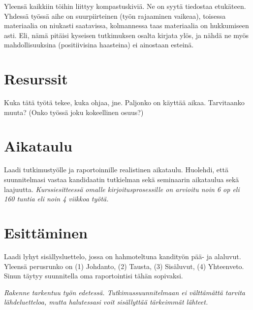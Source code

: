 \documentclass[12pt,a4paper,finnish,oneside]{article}
\begin{document}
Yleensä kaikkiin töihin liittyy kompastuskiviä. Ne on syytä tiedostaa
etukäteen. Yhdessä työssä aihe on suurpiirteinen (työn rajaaminen
vaikeaa), toisessa materiaalia on niukasti saatavissa, kolmannessa
taas materiaalia on hukkumiseen asti.  Eli, nämä pitäisi kyseisen
tutkimuksen osalta kirjata ylös, ja nähdä ne myös mahdollisuuksina
(positiivisina haasteina) ei ainostaan esteinä.

\section{Resurssit}

Kuka tätä työtä tekee, kuka ohjaa, jne. Paljonko on käyttää
aikaa. Tarvitaanko muuta? (Onko työssä joku kokeellinen osuus?)

\section{Aikataulu}

Laadi tutkimustyölle ja raportoinnille realistinen aikataulu.
Huolehdi, että suunnitelmasi vastaa kandidaatin tutkielman sekä
seminaarin aikataulua sekä laajuutta.  \emph{Kurssiesitteessä omalle
  kirjoitusprosessille on arvioitu noin 6 op eli 160 tuntia eli noin 4
  viikkoa työtä.}



\section{Esittäminen}

Laadi lyhyt sisällysluettelo, jossa on hahmoteltuna kandityön pää- ja
alaluvut. Yleensä perusrunko on
(1) Johdanto,
(2) Tausta,
(3) Sisäluvut,
(4) Yhteenveto.
%
Sinun täytyy suunnitella oma raportointisi tähän sopivaksi.

\emph{Rakenne tarkentuu työn edetessä. Tutkimussuunnitelmaan ei välttämättä tarvita lähdeluetteloa, mutta halutessasi voit sisällyttää tärkeimmät lähteet.}

%


% 

\renewcommand{\refname}{Lähteet}  %



\end{document}
